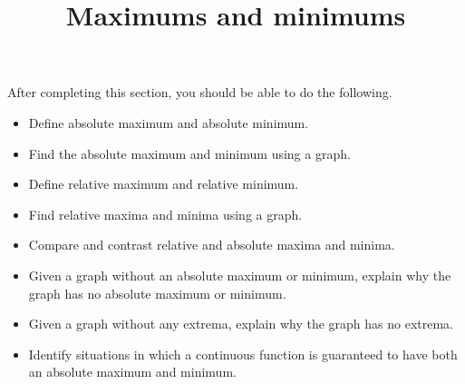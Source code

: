 \documentclass{ximera}
\title{Maximums and minimums}
\begin{document}
\begin{abstract}
\end{abstract}

\maketitle

\begin{sectionOutcomes}

After completing this section, you should be able to do the following.

\begin{itemize}
	\item Define absolute maximum and absolute minimum.
	\item Find the absolute maximum and minimum using a graph.
	\item Define relative maximum and relative minimum.
    \item Find relative maxima and minima using a graph.
	\item Compare and contrast relative and absolute maxima and minima.
    \item Given a graph without an absolute maximum or minimum, explain why the graph has no absolute maximum or minimum. 
    \item Given a graph without any extrema, explain why the graph has no extrema. 
	\item Identify situations in which a continuous function is guaranteed to have both an absolute maximum and minimum.
\end{itemize}

\end{sectionOutcomes}
\end{document}
